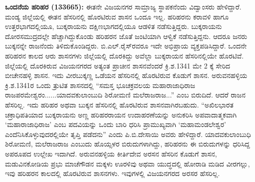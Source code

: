 \textbf{ಒಂದನೆಯ ಹರಿಹರ (1336\general{\enginline{-}}65):} ಈತನೇ ವಿಜಯನಗರ ಸಾಮ್ರಾಜ್ಯ ಸ್ಥಾಪಕನೆಂದು ವಿದ್ವಾಂಸರು ಹೇಳಿದ್ದಾರೆ. ಮಂಡ್ಯ ಜಿಲ್ಲೆಯಲ್ಲಿ ಈತನ ಹೆಸರಿನಲ್ಲಿ ಹೊರಟಿರುವ ಶಾಸನ ಒಂದೂ ಇಲ್ಲ. ಹರಿಹರನು ಕರಾವಳಿ ಹಾಗೂ ಉತ್ತರಭಾಗದಲ್ಲಿಯೂ, ಬುಕ್ಕರಾಯನು ದಕ್ಷಿಣಭಾಗದಲ್ಲಿಯೂ ಆಡಳಿತ ನಡೆಸುತ್ತಿದ್ದರು. ಬುಕ್ಕರಾಯನು ದೋರಸಮುದ್ರದಲ್ಲೇ ಹೆಚ್ಚಾಗಿದ್ದುಕೊಂಡು ಹರಿಹರನ ಜೊತೆ ಜಂಟಿಯಾಗಿ ಆಳ್ವಿಕೆ ನಡೆಸುತ್ತಿದ್ದನು. ಆದರೂ ಜನರು ಬುಕ್ಕನನ್ನೇ ರಾಜನೆಂದು ತಿಳಿದುಕೊಂಡಿದ್ದರು. ಬಿ.ಎಲ್​.ರೈಸ್​ರವರೂ ಇದೇ ಅಭಿಪ್ರಾಯ ವ್ಯಕ್ತಪಡಿಸಿದ್ದಾರೆ. ಒಂದನೇ ಹರಿಹರನ ಕಾಲದ ಆರು ಶಾಸನಗಳು ಜಿಲ್ಲೆಯಲ್ಲಿ ದೊರಕಿದ್ದು ಅವೆಲ್ಲಾ ಬುಕ್ಕರಾಯನ ಹೆಸರಿನಲ್ಲಿಯೇ ಹೊರಟಿವೆ. ಜಿಲ್ಲೆಯಲ್ಲಿ ದೊರಕಿರುವ ವಿಜಯನಗರದ ಅತ್ಯಂತ ಪ್ರಾಚೀನ ಶಾಸನವೆಂದರೆ ಕ್ರಿ.ಶ.1341 ಮೇ 2 ಕ್ಕೆ ಸೇರಿದ ಬೀಚೇನಹಳ್ಳಿ ಶಾಸನ. ಇದು ವೀರಬುಕ್ಕಣ್ಣ ಒಡೆಯನ ಹೆಸರಿನಲ್ಲಿ ಹೊರಟಿರುವ ಕೊಡುಗೆ ಶಾಸನ. ಅರುವನಹಳ್ಳಿಯ ಕ್ರಿ.ಶ.1341ರ ಒಂದು ತ್ರುಟಿತ ಶಾಸನದಲ್ಲಿ “ಸಮಸ್ತ ಭೂಚಕ್ರವಲಯ ಮಹಾರಾಜಾಧಿರಾಜ ರಾಜಪರಮೇಶ್ವರಂ......ಯಾದವಕುಲಾಂಬುದಿ ಶಿರೋಮಣಿ ಮಲೆರಾಜರಾಜ...” ಎಂಬ ಬಿರುದಿದೆ. ಆದರೆ ರಾಜನ ಹೆಸರಿಲ್ಲ. ಇದು ಹರಿಹರ ಅಥವಾ ಬುಕ್ಕನ ಹೆಸರಿನಲ್ಲಿ ಹೊರಟಿರುವ ಶಾಸನವಾಗಿರ\-ಬಹುದು. “ಅಖಿಲಭಾರತ ಚಕ್ರಾಧಿಪತಿಯಾದ ಬುಕ್ಕರಾಯನು ಅಣ್ಣ ಹರಿಹರರಾಯನ ಉದಾಹರಣೆಯನ್ನು ಅನುಕರಿಸಿ ಅಪವಾದಾತ್ಮಕವಾಗಿ ‘ಮಹಾರಾಜಾಧಿರಾಜ’ ಎಂಬ ಪದವಿಯನ್ನು ಒಂದು ಬಾರಿ ಧರಿಸಿ ಪ್ರಾಮುಖ್ಯವಾಗಿ ‘ಮಹಾಮಂಡಲೇಶ್ವರ’ ಎಂದೆನಿಸಿಕೊಳ್ಳು\-ವುದರಲ್ಲಿಯೇ ತೃಪ್ತಿ ಪಡೆದನು” ಎಂದು ಪಿ.ಬಿ.ದೇಸಾಯಿ ಅವರು ಹೇಳಿದ್ದಾರೆ. ಯಾದವಕುಲಾಂಬುಧಿ ಶಿರೋಮಣಿ, ಮಲೆರಾಜರಾಜ ಎಂಬುದು ಹೊಯ್ಸಳರ ಬಿರುದುಗಳಾಗಿದ್ದು, ಹರಿಹರನು ಈ ಬಿರುದುಗಳನ್ನು ಧರಿಸಿದ್ದ ಅಪರೂಪದ ಉಲ್ಲೇಖ ಇದಾಗಿದೆ. ಅರುವನಹಳ್ಳಿಯ ಕೀರ್ತಿದೇವ ಅರಸನ ಹೆಸರಿನ ಕೊಡುಗೆ ಶಾಸನ, ಮಡುವಿನಕೋಡಿಯ ಪ್ರಭು ಮಾಚೆಗೌಡನ ಮಕ್ಕಳು ಊರಳಿವು ಅಥವಾ ಯುದ್ಧದಲ್ಲಿ ಹೋರಾಡಿ ಮಡಿದ ವೀರಗಲ್ಲು, ಇವು ಹರಿಹರನ ಕಾಲದಲ್ಲಿ ಹೊರಟಿರುವ ಶಾಸನಗಳು. ಇವುಗಳಲ್ಲಿ ವಿಜಯನಗರದ ಅರಸರ ಹೆಸರಿಲ್ಲ.

